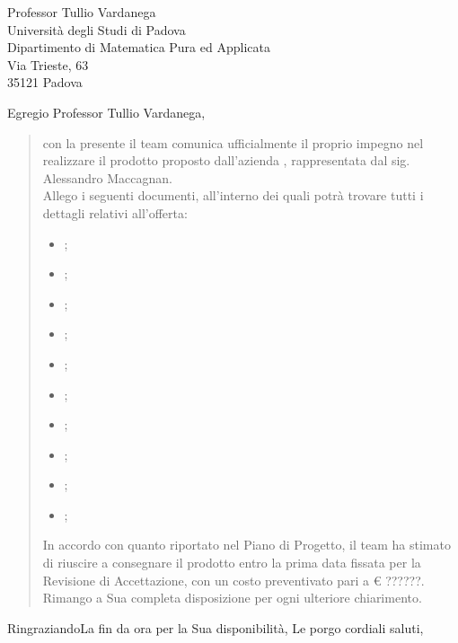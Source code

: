 \date{Padova, 22 Gennaio 2016}
\begin{letter}{
	Professor Tullio Vardanega \\
	Università degli Studi di Padova \\
	Dipartimento di Matematica Pura ed Applicata \\
	Via Trieste, 63 \\
	35121 Padova
}
\signature{
\begin{center}
\textit{
\Responsabile{} \\
Responsabile \GroupName{}
}
\end{center}
}
\opening{Egregio Professor Tullio Vardanega,}
\begin{quotation}
con la presente il team \GroupName comunica ufficialmente il proprio impegno nel realizzare il prodotto \ProjectName proposto dall'azienda \Proponente, rappresentata dal sig. Alessandro Maccagnan. \\
Allego i seguenti documenti, all'interno dei quali potrà trovare tutti i dettagli relativi all'offerta:
\begin{itemize}
\item \AnalisiDeiRequisiti{};
\item \DefinizioneDiProdotto{};
\item \Glossario{};
\item \ManualeAdmin{};
\item \ManualeSviluppatore{};
\item \ManualeUtente{};
\item \NormeDiProgetto{};
\item \PianoDiProgetto{};
\item \PianoDiQualifica{};
\item \SpecificaTecnica{};
\end{itemize}
In accordo con quanto riportato nel Piano di Progetto, il team ha stimato di riuscire a consegnare il prodotto entro la prima data fissata per la Revisione di Accettazione, con un costo preventivato pari a € ??????.\\ %
Rimango a Sua completa disposizione per ogni ulteriore chiarimento.
\end{quotation}
\closing{RingraziandoLa fin da ora per la Sua disponibilità, Le porgo cordiali saluti,}
\end{letter}
